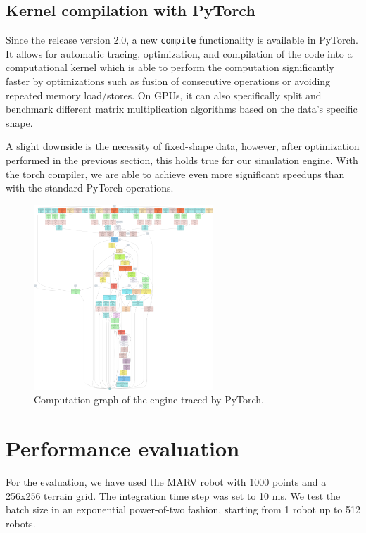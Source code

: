\documentclass[a4paper,12pt]{article}
\begin{document}
\subsection{Kernel compilation with PyTorch}
Since the release version 2.0, a new \texttt{compile} functionality is available in PyTorch. It allows for automatic tracing, optimization, and compilation of the code into a computational kernel which is able to perform the computation significantly faster by optimizations such as fusion of consecutive operations or avoiding repeated memory load/stores. On GPUs, it can also specifically split and benchmark different matrix multiplication algorithms based on the data's specific shape.

A slight downside is the necessity of fixed-shape data, however, after optimization performed in the previous section, this holds true for our simulation engine. With the torch compiler, we are able to achieve even more significant speedups than with the standard PyTorch operations.

\begin{figure}[H]
  \centering
  \includegraphics[width=0.6\textwidth]{fig/graph_diagram.pdf}
  \caption{Computation graph of the engine traced by PyTorch.}
  \label{fig:speedup}
\end{figure}

\clearpage

\section{Performance evaluation}

For the evaluation, we have used the MARV robot with 1000 points and a 256x256 terrain grid. The integration time step was set to 10 ms. We test the batch size in an exponential power-of-two fashion, starting from 1 robot up to 512 robots. 
\end{document}
